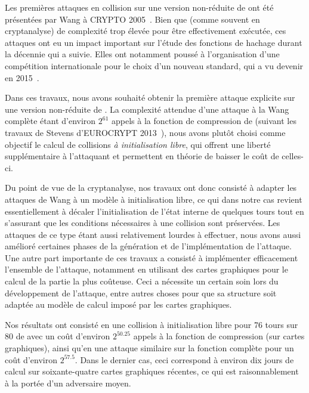 \medskip

Les premières attaques en collision sur une version non-réduite de \shaone ont été présentées par Wang \etal à CRYPTO 2005~\cite{DBLP:conf/crypto/WangYY05a}. Bien que (comme souvent en cryptanalyse) de complexité
trop élevée pour être effectivement exécutée, ces attaques ont eu un impact important sur l'étude des fonctions de hachage durant la décennie qui a suivie. Elles ont notamment poussé à l'organisation
d'une compétition internationale pour le choix d'un nouveau standard, qui a vu \keccak devenir \shathree en 2015~\cite{Nist-SHA3}.

Dans ces travaux, nous avons souhaité obtenir la première attaque explicite sur une version non-réduite de \shaone. La complexité attendue d'une attaque à la Wang complète étant d'environ $2^{61}$ appels
à la fonction de compression de \shaone (suivant les travaux de Stevens d'EUROCRYPT 2013~\cite{DBLP:conf/eurocrypt/Stevens13}), nous avons plutôt choisi comme objectif le calcul de collisions
\emph{à initialisation libre}, qui offrent une liberté supplémentaire à l'attaquant et permettent en théorie de baisser le coût de celles-ci.

Du point de vue de la cryptanalyse, nos travaux ont
donc consisté à adapter les attaques de Wang \etal à un modèle à initialisation libre, ce qui dans notre cas revient essentiellement à décaler l'initialisation de l'état interne \shaone de quelques
tours tout en s'assurant que les conditions nécessaires à une collision sont préservées. Les attaques de ce type étant aussi relativement lourdes à effectuer, nous avons aussi amélioré certaines
phases de la génération et de l'implémentation de l'attaque.
Une autre part importante de ces travaux a consisté à implémenter efficacement l'ensemble de l'attaque, notamment en utilisant des cartes graphiques pour le calcul de la partie la plus coûteuse.
Ceci a nécessite un certain soin lors du développement de l'attaque, entre autres choses pour que sa structure soit adaptée au modèle de calcul imposé par les cartes graphiques.

Nos résultats ont consisté en une collision à initialisation libre pour 76 tours sur 80 de \shaone avec un coût d'environ $2^{50.25}$ appels à la fonction de compression (sur cartes graphiques),
ainsi qu'en une attaque similaire sur la fonction complète pour un coût d'environ $2^{57.5}$. Dans le dernier cas, ceci correspond à environ dix jours de calcul sur soixante-quatre cartes
graphiques récentes, ce qui est raisonnablement à la portée d'un adversaire moyen.


